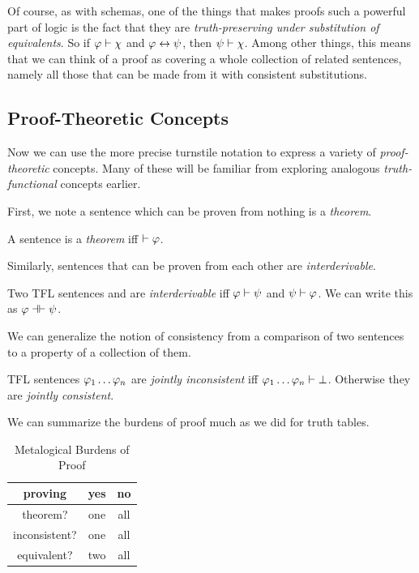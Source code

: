 Of course, as with schemas, one of the things that makes proofs such a powerful
part of logic is the fact that they are \emph{truth-preserving under
substitution of equivalents}. So if $\varphi\vdash\chi$ and $\varphi\leftrightarrow\psi$,
then $\psi\vdash\chi$. Among other things, this means that we can think of a
proof as covering a whole collection of related sentences, namely all those
that can be made from it with consistent substitutions.

\subsection{Proof-Theoretic Concepts}

Now we can use the more precise turnstile notation to express a variety of
\emph{proof-theoretic} concepts. Many of these will be familiar from exploring
analogous \emph{truth-functional} concepts earlier.

First, we note a sentence which can be proven from nothing is a \emph{theorem}.

\begin{definition}[Theorem]
  \label{def:theorem}
  A sentence \sphi is a \emph{theorem} iff $\vdash\varphi$.
\end{definition}

Similarly, sentences that can be proven from each other are
\emph{interderivable}.

\begin{definition}[Interderivable]
  \label{def:interderivable}
  Two TFL sentences \sphi and \spsi are \emph{interderivable} iff
  $\varphi\vdash\psi$ and $\psi\vdash\varphi$. We can write this as
  $\varphi\dashv\vdash\psi$.
\end{definition}

We can generalize the notion of consistency from a comparison of two sentences
to a property of a collection of them.

\begin{definition}
  \label{def:joint-consistency}
  TFL sentences $\varphi_1\dots\varphi_n$ are \emph{jointly inconsistent} iff
  $\varphi_1\dots\varphi_n\vdash\bot$. Otherwise they are \emph{jointly
  consistent}.
\end{definition}

We can summarize the burdens of proof much as we did for truth tables.

\begin{table}[h]
  \centering
  \begin{tabular}{|c||c|c|}
    \hline
    proving       & \textbf{yes} & \textbf{no} \\
    \hline
    theorem?      & one          & all         \\
    inconsistent? & one          & all         \\
    equivalent?   & two          & all         \\
    \hline
  \end{tabular}
  \caption{Metalogical Burdens of Proof}
\end{table}

